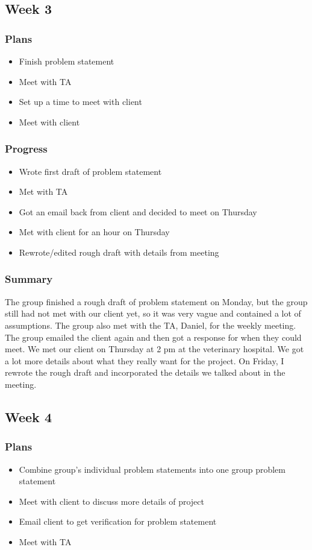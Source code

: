 \documentclass[onecolumn, draftclsnofoot,10pt, compsoc]{IEEEtran}
\begin{document}
\subsection{Week 3}

\subsubsection{Plans}
\begin{itemize}
\item Finish problem statement
\item Meet with TA
\item Set up a time to meet with client
\item Meet with client
\end{itemize}

\subsubsection{Progress}
\begin{itemize}
\item Wrote first draft of problem statement
\item Met with TA
\item Got an email back from client and decided to meet on Thursday
\item Met with client for an hour on Thursday
\item Rewrote/edited rough draft with details from meeting
\end{itemize}
\subsubsection{Summary}
The group  finished a rough draft of problem statement on Monday, but the group still had not met with our client yet, so it was very vague and contained a lot of assumptions. The group also met with the TA, Daniel, for the weekly meeting. The group emailed the client again and then got a response for when they could meet. We met our client on Thursday at 2 pm at the veterinary hospital. We got a lot more details about what they really want for the project. On Friday, I rewrote the rough draft and incorporated the details we talked about in the meeting. 

\subsection{Week 4}

\subsubsection{Plans}
\begin{itemize}
\item Combine group's individual problem statements into one group problem statement
\item Meet with client to discuss more details of project
\item Email client to get verification for problem statement
\item Meet with TA
\end{itemize}
\end{document}
